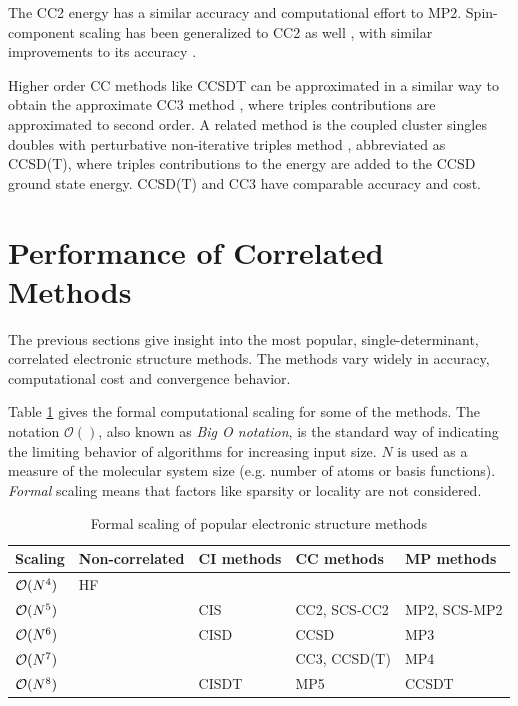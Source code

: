 The CC2 energy has a similar accuracy and computational effort to MP2. Spin-component scaling has been generalized to CC2 as well \cite{Hel2008,Win2011}, with similar improvements to its accuracy \cite{Taj2019}. 

Higher order CC methods like CCSDT can be approximated in a similar way to obtain the approximate CC3 method \cite{Koc1997}, where triples contributions are approximated to second order. A related method is the coupled cluster singles doubles with perturbative non-iterative triples method \cite{Rag1989}, abbreviated as CCSD(T), where triples contributions to the energy are added to the CCSD ground state energy. CCSD(T) and CC3 have comparable accuracy and cost. 


\section{Performance of Correlated Methods}

The previous sections give insight into the most popular, single-determinant, correlated electronic structure methods. The methods vary widely in accuracy, computational cost and convergence behavior. 

Table \ref{tab:SCALINGS} gives the formal computational scaling for some of the methods. The notation $\mathcal{O}()$, also known as \emph{Big O notation}, is the standard way of indicating the limiting behavior of algorithms for increasing input size. $N$ is used as a measure of the molecular system size (e.g. number of atoms or basis functions). \emph{Formal} scaling means that factors like sparsity or locality are not considered.

\begin{table}
\centering
\begin{tabular}{lllll} 
\hline 
Scaling & Non-correlated & CI methods & CC methods & MP methods \\ \hline
$\mathcal{O}(N^{4})$ & HF &  &  &  \\
$\mathcal{O}(N^{5})$ & & CIS & CC2, SCS-CC2 & MP2, SCS-MP2 \\
$\mathcal{O}(N^{6})$ & & CISD & CCSD & MP3 \\
$\mathcal{O}(N^{7})$ & & & CC3, CCSD(T) & MP4 \\
$\mathcal{O}(N^{8})$ & & CISDT & MP5 & CCSDT \\
\hline 
\end{tabular}
\caption{Formal scaling of popular electronic structure methods}
\label{tab:SCALINGS}
\end{table}

